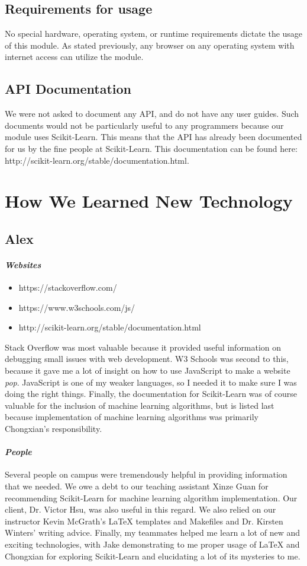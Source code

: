 \documentclass[onecolumn, draftclsnofoot,10pt, compsoc]{IEEEtran}
\begin{document}
\subsection{Requirements for usage}
No special hardware, operating system, or runtime requirements dictate the usage of this module. As stated previously, any browser on any operating system with internet access can utilize the module.
\subsection{API Documentation}
We were not asked to document any API, and do not have any user guides. Such documents would not be particularly useful to any programmers because our module uses Scikit-Learn. This means that the API has already been documented for us by the fine people at Scikit-Learn. This documentation can be found here: http://scikit-learn.org/stable/documentation.html.

\section{How We Learned New Technology}
\subsection{Alex}
\paragraph{\emph{Websites}}
\begin{itemize}
\item https://stackoverflow.com/ 
\item https://www.w3schools.com/js/
\item http://scikit-learn.org/stable/documentation.html
\end{itemize}
Stack Overflow was most valuable because it provided useful information on debugging small issues with web development. W3 Schools was second to this, because it gave me a lot of insight on how to use JavaScript to make a website \emph{pop}. JavaScript is one of my weaker languages, so I needed it to make sure I was doing the right things. Finally, the documentation for Scikit-Learn was of course valuable for the inclusion of machine learning algorithms, but is listed last because implementation of machine learning algorithms was primarily Chongxian's responsibility.
\paragraph{\emph{People}}
Several people on campus were tremendously helpful in providing information that we needed. We owe a debt to our teaching assistant Xinze Guan for recommending Scikit-Learn for machine learning algorithm implementation. Our client, Dr. Victor Hsu, was also useful in this regard. We also relied on our instructor Kevin McGrath's LaTeX templates and Makefiles and Dr. Kirsten Winters' writing advice. Finally, my teammates helped me learn a lot of new and exciting technologies, with Jake demonstrating to me proper usage of LaTeX and Chongxian for exploring Scikit-Learn and elucidating a lot of its mysteries to me. 
\end{document}
